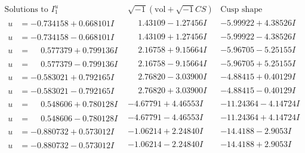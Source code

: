\documentclass[1p]{elsarticle_modified}
\theoremstyle{definition}
\newcommand{\I}{\sqrt{-1}}
\begin{document}
$$\begin{array}{c|c|c}  
\text{Solutions to }I^u_{1}& \I (\text{vol} + \sqrt{-1}CS) & \text{Cusp shape}\\
 \hline 
\begin{aligned}
u &= -0.734158 + 0.668101 I\end{aligned}
 & \phantom{-}1.43109 - 1.27456 I & -5.99922 + 4.38526 I \\ \hline\begin{aligned}
u &= -0.734158 - 0.668101 I\end{aligned}
 & \phantom{-}1.43109 + 1.27456 I & -5.99922 - 4.38526 I \\ \hline\begin{aligned}
u &= \phantom{-}0.577379 + 0.799136 I\end{aligned}
 & \phantom{-}2.16758 + 9.15664 I & -5.96705 - 5.25155 I \\ \hline\begin{aligned}
u &= \phantom{-}0.577379 - 0.799136 I\end{aligned}
 & \phantom{-}2.16758 - 9.15664 I & -5.96705 + 5.25155 I \\ \hline\begin{aligned}
u &= -0.583021 + 0.792165 I\end{aligned}
 & \phantom{-}2.76820 - 3.03900 I & -4.88415 + 0.40129 I \\ \hline\begin{aligned}
u &= -0.583021 - 0.792165 I\end{aligned}
 & \phantom{-}2.76820 + 3.03900 I & -4.88415 - 0.40129 I \\ \hline\begin{aligned}
u &= \phantom{-}0.548606 + 0.780128 I\end{aligned}
 & -4.67791 + 4.46553 I & -11.24364 - 4.14724 I \\ \hline\begin{aligned}
u &= \phantom{-}0.548606 - 0.780128 I\end{aligned}
 & -4.67791 - 4.46553 I & -11.24364 + 4.14724 I \\ \hline\begin{aligned}
u &= -0.880732 + 0.573012 I\end{aligned}
 & -1.06214 + 2.24840 I & -14.4188 - 2.9053 I \\ \hline\begin{aligned}
u &= -0.880732 - 0.573012 I\end{aligned}
 & -1.06214 - 2.24840 I & -14.4188 + 2.9053 I \\ \hline\begin{aligned}

\end{aligned}
\end{array}$$
\end{document}
